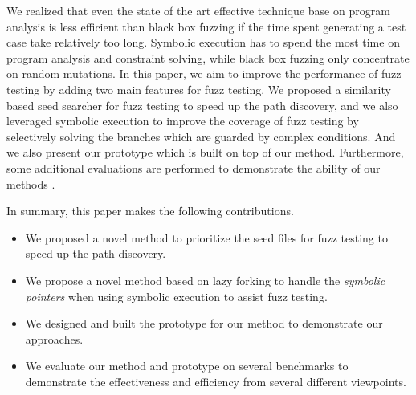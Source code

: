 We realized that even the state of the art effective technique base on program analysis is less efficient than black box fuzzing if the time spent generating a test case take relatively too long. Symbolic execution has to spend the most time on program analysis and constraint solving, while black box fuzzing only concentrate on random mutations. In this paper, we aim to improve the performance of fuzz testing by adding two main features for fuzz testing. We proposed a similarity based seed searcher for fuzz testing to speed up the path discovery, and we also leveraged symbolic execution to improve the coverage of fuzz testing by selectively solving the branches which are guarded by complex conditions. And we also present our prototype which is built on top of our method. Furthermore, some additional evaluations are performed to demonstrate the ability of our methods \cite{patashnik-bibtexing}.
 
In summary, this paper makes the following contributions.
\begin{itemize}
\item We proposed a novel method to prioritize the seed files for fuzz testing to speed up the path discovery.

\item We propose a novel method based on lazy forking to handle the \emph{symbolic pointers} when using symbolic execution to assist fuzz testing.

\item We designed and built the prototype for our method to demonstrate our approaches.

\item We evaluate our method and prototype on several benchmarks to demonstrate the effectiveness and efficiency from several different viewpoints.
\end{itemize}